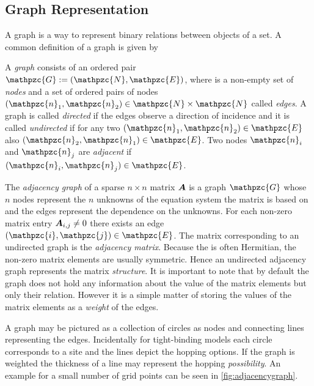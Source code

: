 \subsection{Graph Representation}
A graph is a way to represent binary relations between objects of a set. A common definition of a graph is given by
\begin{dfn}
A \emph{graph}  consists of an ordered pair $\mathpzc{G} :=(\mathpzc{N},\mathpzc{E})$, where  is a non-empty set of \emph{nodes}  and  a set of ordered pairs of nodes $(\mathpzc{n}_1,\mathpzc{n}_2) \in \mathpzc{N} \times \mathpzc{N}$ called \emph{edges}.
A graph is called \emph{directed} if the edges observe a direction of incidence  and it is called \emph{undirected} if for any two $(\mathpzc{n}_1,\mathpzc{n}_2) \in \mathpzc{E}$ also $(\mathpzc{n}_2,\mathpzc{n}_1) \in \mathpzc{E}$.
Two nodes $\mathpzc{n}_i$ and $\mathpzc{n}_j$ are \emph{adjacent} if $(\mathpzc{n}_i,\mathpzc{n}_j) \in \mathpzc{E}$. \cite{graham1995handbook}
\end{dfn}
The \emph{adjacency graph} of a sparse $n \times n$ matrix $\boldsymbol{A}$ is a graph $\mathpzc{G}$ whose $n$ nodes represent the $n$ unknowns of the equation system the matrix is based on and the edges represent the dependence on the unknowns. For each non-zero matrix entry $\boldsymbol{A}_{i,j}\neq 0$ there exists an edge $(\mathpzc{i},\mathpzc{j}) \in \mathpzc{E}$. The matrix corresponding to an undirected graph is the \emph{adjacency matrix}. Because the \hamil{} is often Hermitian, the non-zero matrix elements are usually symmetric. Hence an undirected adjacency graph represents the matrix \emph{structure}. It is important to note that by default the graph does not hold any information about the value of the matrix elements but only their relation. However it is a simple matter of storing the values of the matrix elements as a \emph{weight} of the edges.\par
A graph may be pictured as a collection of circles as nodes and connecting lines representing the edges. Incidentally for tight-binding models each circle corresponds to a site and the lines depict the hopping options. If the graph is weighted the thickness of a line may represent the hopping \emph{possibility}. An example for a small number of grid points can be seen in \cref{fig:adjacencygraph}.


